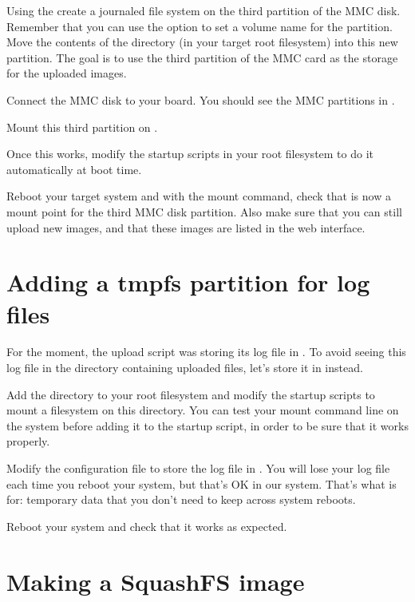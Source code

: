 Using the  create a journaled file system on the
third partition of the MMC disk. Remember that you can use the
 option to set a volume name for the partition. Move the
contents of the  directory (in your target root
filesystem) into this new partition. The goal is to use the third
partition of the MMC card as the storage for the uploaded images.

Connect the MMC disk to your board. You should see the MMC partitions
in .
  
Mount this third partition on .

Once this works, modify the startup scripts in your root filesystem
to do it automatically at boot time.

Reboot your target system and with the mount command, check that
 is now a mount point for the third MMC disk
partition. Also make sure that you can still upload new images, and
that these images are listed in the web interface.

\section{Adding a tmpfs partition for log files}

For the moment, the upload script was storing its log file in
. To avoid seeing this log file in
the directory containing uploaded files, let's store it in
 instead.

Add the  directory to your root filesystem and modify
the startup scripts to mount a  filesystem on this
directory. You can test your  mount command line on the
system before adding it to the startup script, in order to be sure
that it works properly.

Modify the  configuration file to store
the log file in . You will lose your log
file each time you reboot your system, but that's OK in our
system. That's what  is for: temporary data that you don't need
to keep across system reboots.

Reboot your system and check that it works as expected.

\section{Making a SquashFS image}


